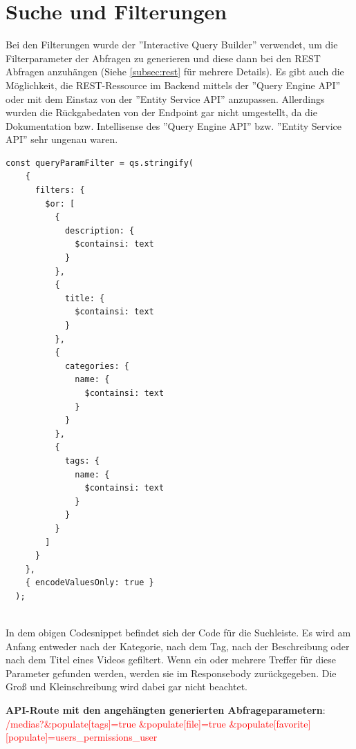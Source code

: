 \section{Suche und Filterungen}

Bei den Filterungen wurde der ''Interactive Query Builder'' verwendet,
um die Filterparameter der Abfragen zu generieren
und diese dann bei den REST Abfragen anzuhängen (Siehe \ref{subsec:rest} für mehrere Details).
Es gibt auch die Möglichkeit, die REST-Ressource im Backend mittels der
''Query Engine API'' oder mit dem Einstaz von der ''Entity Service API'' anzupassen.
Allerdings wurden die Rückgabedaten von der Endpoint gar nicht umgestellt,
da die Dokumentation bzw. Intellisense  des ''Query Engine API'' bzw. ''Entity Service API'' sehr ungenau waren.


\begin{lstlisting}[caption=Code von Interactive Query Builder]
  const queryParamFilter = qs.stringify(
    {
      filters: {
        $or: [
          {
            description: {
              $containsi: text
            }
          },
          {
            title: {
              $containsi: text
            }
          },
          {
            categories: {
              name: {
                $containsi: text
              }
            }
          },
          {
            tags: {
              name: {
                $containsi: text
              }
            }
          }
        ]
      }
    },
    { encodeValuesOnly: true }
  );
  
\end{lstlisting}
In dem obigen Codesnippet befindet sich der Code für die Suchleiste.
Es wird am Anfang entweder nach der Kategorie, nach dem Tag,
nach der Beschreibung oder nach dem Titel eines Videos gefiltert.
Wenn ein oder mehrere Treffer für diese Parameter gefunden werden,
werden sie im Responsebody zurückgegeben.
Die Groß und Kleinschreibung wird dabei gar nicht beachtet.


\textbf{API-Route mit den angehängten generierten Abfrageparametern}:
\newline
\textcolor{red}{/medias?\&populate[tags]=true
\&populate[file]=true
\&populate[favorite][populate]=\newline users\_permissions\_user}

